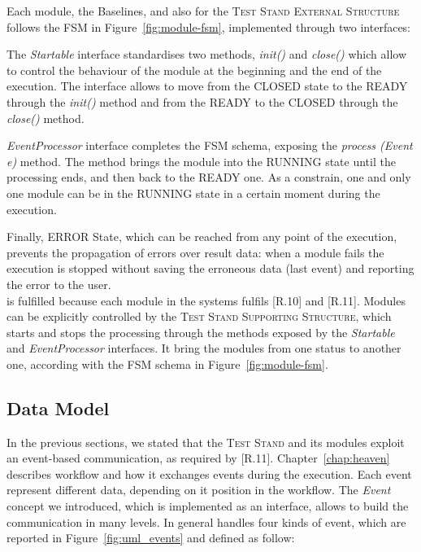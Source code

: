 Each \name module, the Baselines, and also for the \textsc{Test Stand External Structure} follows the FSM in Figure~\ref{fig:module-fsm}, implemented through two interfaces: 

The \textit{Startable} interface standardises two methods, \textit{init()} and \textit{close()} which allow to control the behaviour of the module at the beginning and the end of the execution. The interface allows to move from the CLOSED state to the READY through the \textit{init()} method and from the READY to the CLOSED through the \textit{close()} method. 

\textit{EventProcessor} interface completes the FSM schema, exposing the \textit{process (Event e)} method. The method brings the module into the RUNNING state until the processing ends, and then back to the READY one. As a constrain, one and only one module can be in the RUNNING state in a certain moment during the execution.

Finally, ERROR State, which can be reached from any point of the execution, prevents the propagation of errors over result data: when a module fails the execution is stopped without saving the erroneous data (last event) and reporting the error to the user.\\


\noindent [R.4] is fulfilled because each module in the systems fulfils [R.10] and [R.11]. \name Modules can be explicitly controlled by the \textsc{Test Stand Supporting Structure}, which starts and stops the processing through the methods exposed by the \textit{Startable} and \textit{EventProcessor} interfaces. It bring the modules from one status to another one, according with the FSM schema in Figure~\ref{fig:module-fsm}.

\pagebreak

\subsection{Data Model}\label{sec:data-impl}

In the previous sections, we stated that the \textsc{Test Stand} and its modules exploit an event-based communication, as required by [R.11]. Chapter~\ref{chap:heaven} describes \name workflow and how it exchanges events during the execution. Each event represent different data, depending on it position in the workflow. The \textit{Event} concept we introduced, which is implemented as an interface, allows to build the communication in many levels. In general \name handles four kinds of event, which are reported in Figure~\ref{fig:uml_events} and defined as follow:

